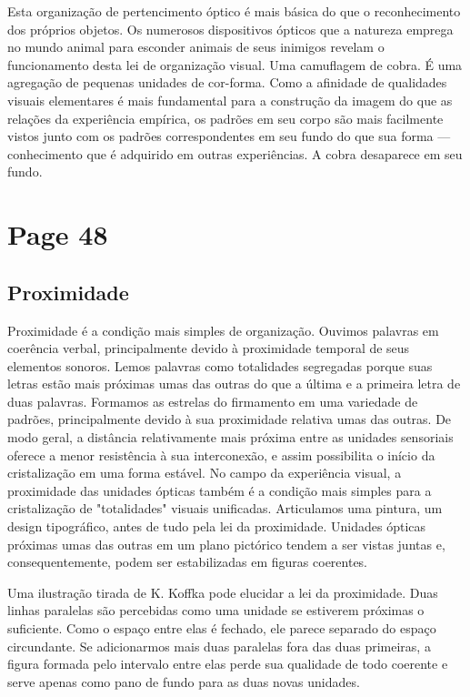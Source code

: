 \documentclass[a4paper]{article}
\begin{document}
Esta organização de pertencimento óptico é mais básica do que o reconhecimento dos próprios objetos. Os numerosos dispositivos ópticos que a natureza emprega no mundo animal para esconder animais de seus inimigos revelam o funcionamento desta lei de organização visual. Uma camuflagem de cobra. É uma agregação de pequenas unidades de cor-forma. Como a afinidade de qualidades visuais elementares é mais fundamental para a construção da imagem do que as relações da experiência empírica, os padrões em seu corpo são mais facilmente vistos junto com os padrões correspondentes em seu fundo do que sua forma --- conhecimento que é adquirido em outras experiências. A cobra desaparece em seu fundo.

\newpage
\section*{Page 48}

\subsection*{Proximidade}

Proximidade é a condição mais simples de organização. Ouvimos palavras em coerência verbal, principalmente devido à proximidade temporal de seus elementos sonoros. Lemos palavras como totalidades segregadas porque suas letras estão mais próximas umas das outras do que a última e a primeira letra de duas palavras. Formamos as estrelas do firmamento em uma variedade de padrões, principalmente devido à sua proximidade relativa umas das outras. De modo geral, a distância relativamente mais próxima entre as unidades sensoriais oferece a menor resistência à sua interconexão, e assim possibilita o início da cristalização em uma forma estável. No campo da experiência visual, a proximidade das unidades ópticas também é a condição mais simples para a cristalização de "totalidades" visuais unificadas. Articulamos uma pintura, um design tipográfico, antes de tudo pela lei da proximidade. Unidades ópticas próximas umas das outras em um plano pictórico tendem a ser vistas juntas e, consequentemente, podem ser estabilizadas em figuras coerentes.

Uma ilustração tirada de K. Koffka pode elucidar a lei da proximidade. Duas linhas paralelas são percebidas como uma unidade se estiverem próximas o suficiente. Como o espaço entre elas é fechado, ele parece separado do espaço circundante. Se adicionarmos mais duas paralelas fora das duas primeiras, a figura formada pelo intervalo entre elas perde sua qualidade de todo coerente e serve apenas como pano de fundo para as duas novas unidades.
\end{document}
